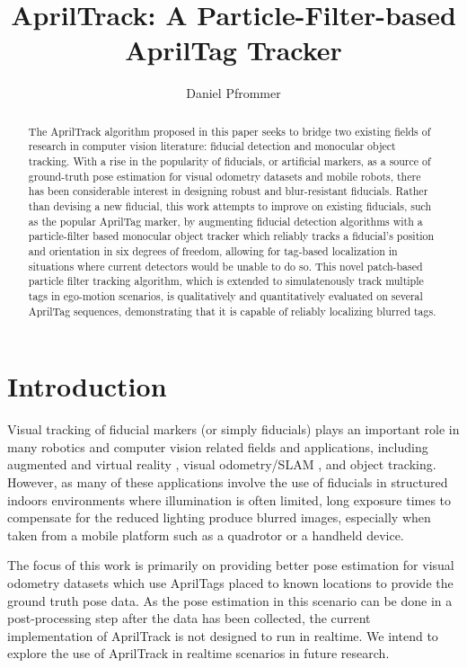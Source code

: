 \documentclass[letterpaper, 10 pt, conference]{ieeeconf}
\title{\textbf{AprilTrack: A Particle-Filter-based AprilTag Tracker}}
\author{Daniel Pfrommer}
\date{}
\begin{document}
\maketitle

\begin{abstract}

	The AprilTrack algorithm proposed in this paper seeks to bridge two existing fields of research in computer vision literature: fiducial detection and monocular object tracking. With a rise in the popularity of fiducials, or artificial markers, as a source of ground-truth pose estimation for visual odometry datasets and mobile robots, there has been considerable interest in designing robust and blur-resistant fiducials. Rather than devising a new fiducial, this work attempts to improve on existing fiducials, such as the popular AprilTag marker, by augmenting fiducial detection algorithms with a particle-filter based monocular object tracker which reliably tracks a fiducial's position and orientation in six degrees of freedom, allowing for tag-based localization in situations where current detectors would be unable to do so. This novel patch-based particle filter tracking algorithm, which is extended to simulatenously track multiple tags in ego-motion scenarios, is qualitatively and quantitatively evaluated on several AprilTag sequences, demonstrating that it is capable of reliably localizing blurred tags.
	
\end{abstract}

\section{Introduction}


Visual tracking of fiducial markers (or simply fiducials) plays an important role in many robotics and computer vision related fields and applications, including augmented and virtual reality \citep{AugmentedReality}, visual odometry/SLAM \citep{TagSLAM}, and object tracking. However, as many of these applications involve the use of fiducials in structured indoors environments where illumination is often limited, long exposure times to compensate for the reduced lighting produce blurred images, especially when taken from a mobile platform such as a quadrotor or a handheld device.

The focus of this work is primarily on providing better pose estimation for visual odometry datasets which use AprilTags placed to known locations to provide the ground truth pose data. As the pose estimation in this scenario can be done in a post-processing step after the data has been collected, the current implementation of AprilTrack is not designed to run in realtime. We intend to explore the use of AprilTrack in realtime scenarios in future research.
\end{document}
